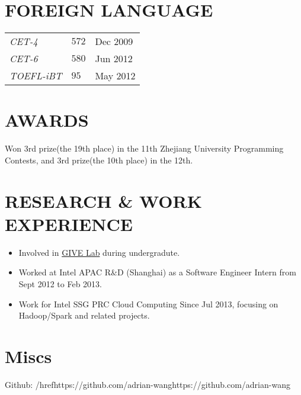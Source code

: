 \documentclass[line,margin]{res}
\begin{document}
\begin{resume}
\section{FOREIGN LANGUAGE}
\begin{tabular}{p{}p{}p{}}
{\sl CET-4} &{$572$} &\hfill Dec 2009\\
{\sl CET-6} &{$580$} &\hfill Jun 2012\\
{\sl TOEFL-iBT} &{$95$} &\hfill May 2012
\end{tabular}
\section{AWARDS}
            Won 3rd prize(the 19th place) in the 11th Zhejiang University Programming Contests, and 3rd prize(the 10th place) in the 12th.

\section{RESEARCH \& WORK\\ EXPERIENCE}
            \begin{itemize}
            \item Involved in \href{http://give.zju.edu.cn/en/portal/index.html}{GIVE Lab} during undergradute.
            \item Worked at Intel APAC R\&D (Shanghai) as a Software Engineer Intern from Sept 2012 to Feb 2013.
            \item Work for Intel SSG PRC Cloud Computing Since Jul 2013, focusing on Hadoop/Spark and related projects.
            \end{itemize}
\section{Miscs}
            Github: /href{https://github.com/adrian-wang}{https://github.com/adrian-wang}
\end{resume}
\end{document}
